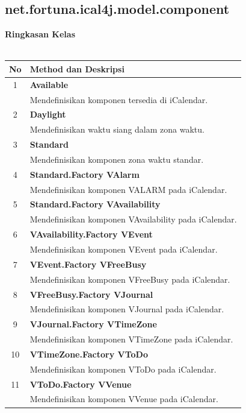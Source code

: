 \subsection{net.fortuna.ical4j.model.component}

	\noindent \textbf{Ringkasan Kelas}\cite{ical}\\ \\
	\begin{tabular}{|c|p{12cm}|}
		\hline
		\textbf{No} & \textbf{Method dan Deskripsi} \\ \hline \hline
		1 & \textbf{Available}\\
			&	Mendefinisikan komponen tersedia di iCalendar.\\ \hline
		2 & \textbf{Daylight}\\
			&	Mendefinisikan waktu siang dalam zona waktu. \\ \hline
		3 & \textbf{Standard}\\
			&	Mendefinisikan komponen zona waktu standar.\\ \hline
		4 & \textbf{Standard.Factory	 
VAlarm}\\
			&	Mendefinisikan komponen VALARM pada iCalendar.\\ \hline
		5 & \textbf{Standard.Factory	 
VAvailability}\\
			&	Mendefinisikan komponen VAvailability pada iCalendar.\\ \hline
		6 & \textbf{VAvailability.Factory	 
VEvent}\\
			&	Mendefinisikan komponen VEvent pada iCalendar.\\ \hline
		7 & \textbf{VEvent.Factory	 
VFreeBusy}\\
			&	Mendefinisikan komponen VFreeBusy pada iCalendar.\\ \hline
		8 & \textbf{VFreeBusy.Factory	 
VJournal}\\
			&	Mendefinisikan komponen VJournal pada iCalendar.\\ \hline
		9 & \textbf{VJournal.Factory	 
VTimeZone}\\
			&	Mendefinisikan komponen VTimeZone pada iCalendar.\\ \hline
		10 & \textbf{VTimeZone.Factory	 
VToDo}\\
			&	Mendefinisikan komponen VToDo pada iCalendar.\\ \hline
		11 & \textbf{VToDo.Factory	 
VVenue}\\
			&	Mendefinisikan komponen VVenue pada iCalendar.\\ \hline	
	\end{tabular}
	
